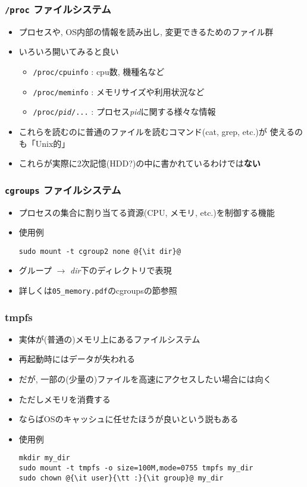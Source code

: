 \documentclass[12pt,dvipdfmx]{beamer}
\begin{document}
\begin{frame}[fragile]
  \frametitle{{\tt /proc} ファイルシステム}
  \begin{itemize}
  \item プロセスや, OS内部の情報を読み出し, 変更できるためのファイル群
  \item いろいろ開いてみると良い
    \begin{itemize}
    \item {\tt /proc/cpuinfo} : cpu数, 機種名など
    \item {\tt /proc/meminfo} : メモリサイズや利用状況など
    \item {\tt /proc/{\it pid}/...} : プロセス{\it pid}に関する様々な情報
    \end{itemize}
  \item これらを読むのに普通のファイルを読むコマンド(cat, grep, etc.)が
    使えるのも「Unix的」
  \item これらが実際に2次記憶(HDD?)の中に書かれているわけでは{\bf ない}
  \end{itemize}
\end{frame}

\begin{frame}[fragile]
  \frametitle{{\tt cgroups} ファイルシステム}
  \begin{itemize}
  \item プロセスの集合に割り当てる資源(CPU, メモリ, etc.)を制御する機能
  \item 使用例
\begin{lstlisting}
sudo mount -t cgroup2 none @{\it dir}@
\end{lstlisting}
\item グループ $\rightarrow$ {\it dir}下のディレクトリで表現
\item 詳しくは{\tt 05\_memory.pdf}のcgroupsの節参照
  \end{itemize}
\end{frame}

\begin{frame}[fragile]
  \frametitle{tmpfs}
  \begin{itemize}
  \item 実体が(普通の)メモリ上にあるファイルシステム
  \item 再起動時にはデータが失われる
  \item だが, 一部の(少量の)ファイルを高速にアクセスしたい場合には向く
  \item ただしメモリを消費する
  \item ならばOSのキャッシュに任せたほうが良いという説もある
    
  \item 使用例
\begin{lstlisting}
mkdir my_dir
sudo mount -t tmpfs -o size=100M,mode=0755 tmpfs my_dir
sudo chown @{\it user}{\tt :}{\it group}@ my_dir
\end{lstlisting}
  \end{itemize}
  \end{frame}
\end{document}
